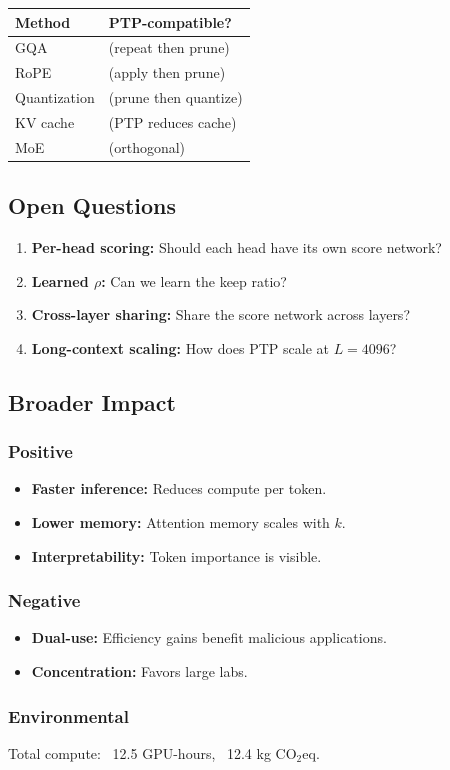 \begin{table}[H]
\centering
\small
\begin{tabular}{ll}
\toprule
\textbf{Method} & \textbf{PTP-compatible?} \\
\midrule
GQA & (repeat then prune) \\
RoPE & (apply then prune) \\
Quantization & (prune then quantize) \\
KV cache & (PTP reduces cache) \\
MoE & (orthogonal) \\
\bottomrule
\end{tabular}
\end{table}

\subsection{Open Questions}

\begin{enumerate}
\item \textbf{Per-head scoring:} Should each head have its own score network?
\item \textbf{Learned $\rho$:} Can we learn the keep ratio?
\item \textbf{Cross-layer sharing:} Share the score network across layers?
\item \textbf{Long-context scaling:} How does PTP scale at $L = 4096$?

\end{enumerate}
\subsection{Broader Impact}

\subsubsection{Positive}
\begin{itemize}
\item \textbf{Faster inference:} Reduces compute per token.
\item \textbf{Lower memory:} Attention memory scales with $k$.
\item \textbf{Interpretability:} Token importance is visible.

\end{itemize}
\subsubsection{Negative}
\begin{itemize}
\item \textbf{Dual-use:} Efficiency gains benefit malicious applications.
\item \textbf{Concentration:} Favors large labs.

\end{itemize}
\subsubsection{Environmental}
Total compute: ~12.5 GPU-hours, ~12.4 kg CO$_2$eq.

